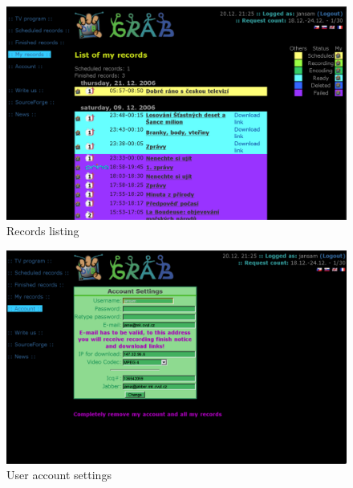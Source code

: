 \documentclass[11pt,twoside,a4paper]{dp_format_en}%
\begin{document}
\vfil
\pagebreak

\begin{figure}[ht]
\begin{center}
\includegraphics[width=12cm]{images/scrSeznam}
\caption{Records listing}
\label{fig:scr3}
\end{center}
\end{figure}

\begin{figure}[ht]
\begin{center}
\includegraphics[width=12cm]{images/scrNastaveni}
\caption{User account settings}
\label{fig:scr4}
\end{center}
\end{figure}

\vfil
\pagebreak
\end{document}
